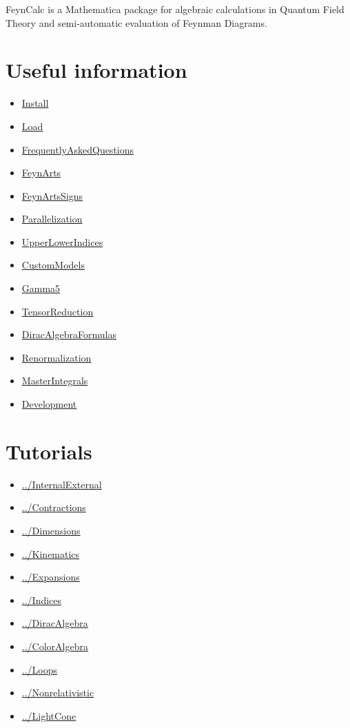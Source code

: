 \documentclass[../FeynCalcManual.tex]{subfiles}
\begin{document}
FeynCalc is a Mathematica package for algebraic calculations in Quantum
Field Theory and semi-automatic evaluation of Feynman Diagrams.

\hypertarget{useful information}{
\section{Useful information}\label{useful information}}

\begin{itemize}
\tightlist
\item
  \hyperlink{install}{Install}
\item
  \hyperlink{load}{Load}
\item
  \hyperlink{frequentlyaskedquestions}{FrequentlyAskedQuestions}
\item
  \hyperlink{feynarts}{FeynArts}
\item
  \hyperlink{feynartssigns}{FeynArtsSigns}
\item
  \hyperlink{parallelization}{Parallelization}
\item
  \hyperlink{upperlowerindices}{UpperLowerIndices}
\item
  \hyperlink{custommodels}{CustomModels}
\item
  \hyperlink{gamma5}{Gamma5}
\item
  \hyperlink{tensorreduction}{TensorReduction}
\item
  \hyperlink{diracalgebraformulas}{DiracAlgebraFormulas}
\item
  \hyperlink{renormalization}{Renormalization}
\item
  \hyperlink{masterintegrals}{MasterIntegrals}
\item
  \hyperlink{development}{Development}
\end{itemize}

\hypertarget{tutorials}{
\section{Tutorials}\label{tutorials}}

\begin{itemize}
\tightlist
\item
  \hyperlink{../internalexternal}{../InternalExternal}
\item
  \hyperlink{../contractions}{../Contractions}
\item
  \hyperlink{../dimensions}{../Dimensions}
\item
  \hyperlink{../kinematics}{../Kinematics}
\item
  \hyperlink{../expansions}{../Expansions}
\item
  \hyperlink{../indices}{../Indices}
\item
  \hyperlink{../diracalgebra}{../DiracAlgebra}
\item
  \hyperlink{../coloralgebra}{../ColorAlgebra}
\item
  \hyperlink{../loops}{../Loops}
\item
  \hyperlink{../nonrelativistic}{../Nonrelativistic}
\item
  \hyperlink{../lightcone}{../LightCone}
\end{itemize}
\end{document}
